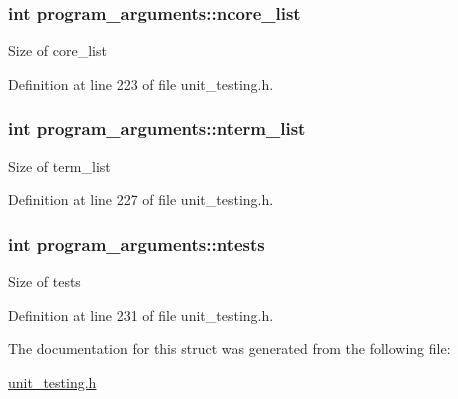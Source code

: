 \subsubsection[{\texorpdfstring{ncore\+\_\+list}{ncore_list}}]{\setlength{\rightskip}{0pt plus 5cm}int program\+\_\+arguments\+::ncore\+\_\+list}\hypertarget{structprogram__arguments_ab9717e16b92f14aa8c54dbf4a2d2b7b1}{}\label{structprogram__arguments_ab9717e16b92f14aa8c54dbf4a2d2b7b1}
Size of {\ttfamily core\+\_\+list} 

Definition at line 223 of file unit\+\_\+testing.\+h.

\subsubsection[{\texorpdfstring{nterm\+\_\+list}{nterm_list}}]{\setlength{\rightskip}{0pt plus 5cm}int program\+\_\+arguments\+::nterm\+\_\+list}\hypertarget{structprogram__arguments_a48fbd16e4ce7ab5438078817c4931108}{}\label{structprogram__arguments_a48fbd16e4ce7ab5438078817c4931108}
Size of {\ttfamily term\+\_\+list} 

Definition at line 227 of file unit\+\_\+testing.\+h.

\subsubsection[{\texorpdfstring{ntests}{ntests}}]{\setlength{\rightskip}{0pt plus 5cm}int program\+\_\+arguments\+::ntests}\hypertarget{structprogram__arguments_a8b96bf14afced6bae0d45424ab2fac57}{}\label{structprogram__arguments_a8b96bf14afced6bae0d45424ab2fac57}
Size of {\ttfamily tests} 

Definition at line 231 of file unit\+\_\+testing.\+h.



The documentation for this struct was generated from the following file\+:\begin{DoxyCompactItemize}
\item 
\hyperlink{unit__testing_8h}{unit\+\_\+testing.\+h}\end{DoxyCompactItemize}
